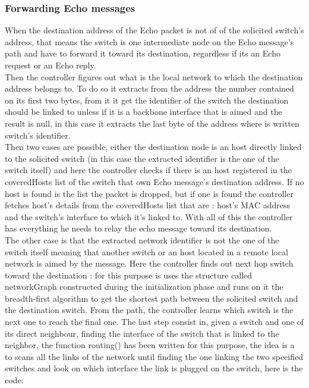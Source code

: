 \documentclass{article}
\begin{document}
\subsubsection{Forwarding Echo messages}

When the destination address of the Echo packet is not of of the
solicited switch's address, that means the switch is one intermediate
node on the Echo message's path and have to forward it toward its
destination, regardless if its an Echo request or an Echo reply.\\
\newline
Then the controller figures out what is the local network to which the
destination address belongs to. To do so it extracts from the address
the number contained on its first two bytes, from it it get the
identifier of the switch the destination should be linked to unless if
it is a backbone interface that is aimed and the result is null, in
this case it extracts the last byte of the address where is written
switch's identifier.\\
\newline
Then two cases are possible, either the destination node is an host
directly linked to the solicited switch (in this case the extracted
identifier is the one of the switch itself) and here the controller
checks if there is an host registered in the coveredHosts list of the
switch that own Echo message's destination address. If no host is
found is the list the packet is dropped, but if one is found the
controller fetches host's details from the coveredHosts list that are :
host's MAC address and the switch's interface to which it's linked
to. With all of this the controller has everything he needs to relay
the echo message toward its destination.\\
\newline
The other case is that the extracted network identifier is not the one
of the switch itself meaning that another switch or an host located in
a remote local network is aimed by the message. Here the controller
finds out next hop switch toward the destination : for this purpose is
uses the structure called networkGraph constructed during the
initialization phase and runs on it the breadth-first algorithm to get
the shortest path between the solicited switch and the destination
switch. From the path, the controller learns which switch is the next
one to reach the final one. The last step consist in, given a switch
and one of its direct neighbour, finding the interface of the switch
that is linked to the neighbor, the function routing() has been
written for this purpose, the idea is a to scans all the links of the
network until finding the one linking the two specified switches and
look on which interface the link is plugged on the switch, here is the
code:
\end{document}
